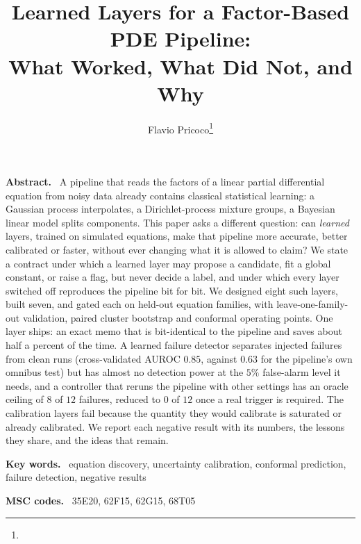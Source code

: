 \documentclass[11pt]{article}
\title{Learned Layers for a Factor-Based PDE Pipeline:\\What Worked, What Did Not, and Why}
\author{Flavio Pricoco\thanks{\email{flaflapr@gmail.com}}}
\newenvironment{keywords}{\par\smallskip\noindent\textbf{Key words.}\ }{\par}
\newenvironment{MSCcodes}{\par\smallskip\noindent\textbf{MSC codes.}\ }{\par}
\renewenvironment{abstract}{\par\small\noindent\textbf{Abstract.}\ }{\par\normalsize}
\theoremstyle{plain}
\theoremstyle{definition}
\theoremstyle{remark}
\begin{document}
\maketitle

\begin{abstract}
A pipeline that reads the factors of a linear partial differential equation from noisy data already contains classical
statistical learning: a Gaussian process interpolates, a Dirichlet-process mixture groups, a Bayesian linear model splits
components. This paper asks a different question: can \emph{learned} layers, trained on simulated equations, make that
pipeline more accurate, better calibrated or faster, without ever changing what it is allowed to claim? We state a
contract under which a learned layer may propose a candidate, fit a global constant, or raise a flag, but never decide a
label, and under which every layer switched off reproduces the pipeline bit for bit. We designed eight such layers, built seven, and
gated each on held-out equation families, with leave-one-family-out validation, paired cluster bootstrap and conformal
operating points. One layer ships: an exact memo that is bit-identical to the pipeline and saves about half a percent of the time.
A learned failure detector separates injected failures from clean runs (cross-validated AUROC $0.85$, against $0.63$ for the
pipeline's own omnibus test) but has almost no detection power at the $5\%$ false-alarm level it needs, and a
controller that reruns the pipeline with other settings has an oracle ceiling of $8$ of $12$ failures, reduced to $0$ of $12$
once a real trigger is required. The calibration layers fail because the quantity they would calibrate is saturated
or already calibrated. We report each negative result with its numbers, the lessons they share, and the ideas that remain.
\end{abstract}

\begin{keywords}
equation discovery, uncertainty calibration, conformal prediction, failure detection, negative results
\end{keywords}

\begin{MSCcodes}
35E20, 62F15, 62G15, 68T05
\end{MSCcodes}
\end{document}
